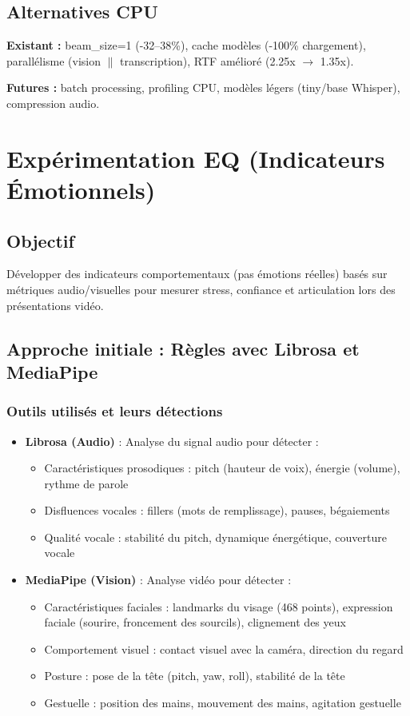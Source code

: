 \documentclass[12pt,a4paper]{article}
\begin{document}
\subsection{Alternatives CPU}
\textbf{Existant :} beam\_size=1 (-32--38\%), cache modèles (-100\% chargement), parallélisme (vision $\parallel$ transcription), RTF amélioré (2.25x $\rightarrow$ 1.35x).

\textbf{Futures :} batch processing, profiling CPU, modèles légers (tiny/base Whisper), compression audio.

\section{Expérimentation EQ (Indicateurs Émotionnels)}

\subsection{Objectif}
Développer des indicateurs comportementaux (pas émotions réelles) basés sur métriques audio/visuelles pour mesurer stress, confiance et articulation lors des présentations vidéo.

\subsection{Approche initiale : Règles avec Librosa et MediaPipe}

\subsubsection{Outils utilisés et leurs détections}
\begin{itemize}
    \item \textbf{Librosa (Audio)} : Analyse du signal audio pour détecter :
    \begin{itemize}
        \item Caractéristiques prosodiques : pitch (hauteur de voix), énergie (volume), rythme de parole
        \item Disfluences vocales : fillers (mots de remplissage), pauses, bégaiements
        \item Qualité vocale : stabilité du pitch, dynamique énergétique, couverture vocale
    \end{itemize}
    \item \textbf{MediaPipe (Vision)} : Analyse vidéo pour détecter :
    \begin{itemize}
        \item Caractéristiques faciales : landmarks du visage (468 points), expression faciale (sourire, froncement des sourcils), clignement des yeux
        \item Comportement visuel : contact visuel avec la caméra, direction du regard
        \item Posture : pose de la tête (pitch, yaw, roll), stabilité de la tête
        \item Gestuelle : position des mains, mouvement des mains, agitation gestuelle
    \end{itemize}
\end{itemize}
\end{document}
